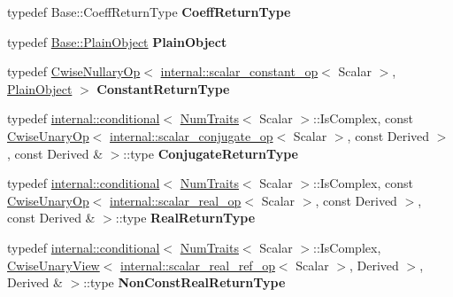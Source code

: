\begin{DoxyCompactItemize}
typedef Base\+::\+Coeff\+Return\+Type {\bfseries Coeff\+Return\+Type}
\item 
\mbox{\label{class_eigen_1_1_array_base_a4283fed1d2cc1085789f53f1895a7550}} 
typedef \mbox{\hyperlink{class_eigen_1_1_dense_base_aae45af9b5aca5a9caae98fd201f47cc4}{Base\+::\+Plain\+Object}} {\bfseries Plain\+Object}
\item 
\mbox{\label{class_eigen_1_1_array_base_a0ad30bd42492f9ef49084afdd0d5fe6e}} 
typedef \mbox{\hyperlink{class_eigen_1_1_cwise_nullary_op}{Cwise\+Nullary\+Op}}$<$ \mbox{\hyperlink{struct_eigen_1_1internal_1_1scalar__constant__op}{internal\+::scalar\+\_\+constant\+\_\+op}}$<$ Scalar $>$, \mbox{\hyperlink{struct_eigen_1_1internal_1_1true__type}{Plain\+Object}} $>$ {\bfseries Constant\+Return\+Type}
\item 
\mbox{\label{class_eigen_1_1_array_base_ac8e2ca380e48a8347e83a7abc14dba8b}} 
typedef \mbox{\hyperlink{struct_eigen_1_1internal_1_1conditional}{internal\+::conditional}}$<$ \mbox{\hyperlink{struct_eigen_1_1_num_traits}{Num\+Traits}}$<$ Scalar $>$\+::Is\+Complex, const \mbox{\hyperlink{class_eigen_1_1_cwise_unary_op}{Cwise\+Unary\+Op}}$<$ \mbox{\hyperlink{struct_eigen_1_1internal_1_1scalar__conjugate__op}{internal\+::scalar\+\_\+conjugate\+\_\+op}}$<$ Scalar $>$, const Derived $>$, const Derived \& $>$\+::type {\bfseries Conjugate\+Return\+Type}
\item 
\mbox{\label{class_eigen_1_1_array_base_a61256fcb763890bca860e3b0366f40bb}} 
typedef \mbox{\hyperlink{struct_eigen_1_1internal_1_1conditional}{internal\+::conditional}}$<$ \mbox{\hyperlink{struct_eigen_1_1_num_traits}{Num\+Traits}}$<$ Scalar $>$\+::Is\+Complex, const \mbox{\hyperlink{class_eigen_1_1_cwise_unary_op}{Cwise\+Unary\+Op}}$<$ \mbox{\hyperlink{struct_eigen_1_1internal_1_1scalar__real__op}{internal\+::scalar\+\_\+real\+\_\+op}}$<$ Scalar $>$, const Derived $>$, const Derived \& $>$\+::type {\bfseries Real\+Return\+Type}
\item 
\mbox{\label{class_eigen_1_1_array_base_a6c7da191683b90003cdc6e77bbd21162}} 
typedef \mbox{\hyperlink{struct_eigen_1_1internal_1_1conditional}{internal\+::conditional}}$<$ \mbox{\hyperlink{struct_eigen_1_1_num_traits}{Num\+Traits}}$<$ Scalar $>$\+::Is\+Complex, \mbox{\hyperlink{class_eigen_1_1_cwise_unary_view}{Cwise\+Unary\+View}}$<$ \mbox{\hyperlink{struct_eigen_1_1internal_1_1scalar__real__ref__op}{internal\+::scalar\+\_\+real\+\_\+ref\+\_\+op}}$<$ Scalar $>$, Derived $>$, Derived \& $>$\+::type {\bfseries Non\+Const\+Real\+Return\+Type}

\end{DoxyCompactItemize}

